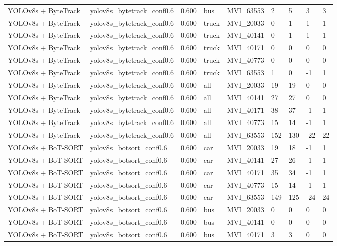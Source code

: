 \begin{tabular}{lllllllll}
YOLOv8s + ByteTrack & yolov8s\_bytetrack\_conf0.6 & 0.600 & bus & MVI\_63553 & 2 & 5 & 3 & 3 \\
YOLOv8s + ByteTrack & yolov8s\_bytetrack\_conf0.6 & 0.600 & truck & MVI\_20033 & 0 & 1 & 1 & 1 \\
YOLOv8s + ByteTrack & yolov8s\_bytetrack\_conf0.6 & 0.600 & truck & MVI\_40141 & 0 & 1 & 1 & 1 \\
YOLOv8s + ByteTrack & yolov8s\_bytetrack\_conf0.6 & 0.600 & truck & MVI\_40171 & 0 & 0 & 0 & 0 \\
YOLOv8s + ByteTrack & yolov8s\_bytetrack\_conf0.6 & 0.600 & truck & MVI\_40773 & 0 & 0 & 0 & 0 \\
YOLOv8s + ByteTrack & yolov8s\_bytetrack\_conf0.6 & 0.600 & truck & MVI\_63553 & 1 & 0 & -1 & 1 \\
YOLOv8s + ByteTrack & yolov8s\_bytetrack\_conf0.6 & 0.600 & all & MVI\_20033 & 19 & 19 & 0 & 0 \\
YOLOv8s + ByteTrack & yolov8s\_bytetrack\_conf0.6 & 0.600 & all & MVI\_40141 & 27 & 27 & 0 & 0 \\
YOLOv8s + ByteTrack & yolov8s\_bytetrack\_conf0.6 & 0.600 & all & MVI\_40171 & 38 & 37 & -1 & 1 \\
YOLOv8s + ByteTrack & yolov8s\_bytetrack\_conf0.6 & 0.600 & all & MVI\_40773 & 15 & 14 & -1 & 1 \\
YOLOv8s + ByteTrack & yolov8s\_bytetrack\_conf0.6 & 0.600 & all & MVI\_63553 & 152 & 130 & -22 & 22 \\
YOLOv8s + BoT-SORT & yolov8s\_botsort\_conf0.6 & 0.600 & car & MVI\_20033 & 19 & 18 & -1 & 1 \\
YOLOv8s + BoT-SORT & yolov8s\_botsort\_conf0.6 & 0.600 & car & MVI\_40141 & 27 & 26 & -1 & 1 \\
YOLOv8s + BoT-SORT & yolov8s\_botsort\_conf0.6 & 0.600 & car & MVI\_40171 & 35 & 34 & -1 & 1 \\
YOLOv8s + BoT-SORT & yolov8s\_botsort\_conf0.6 & 0.600 & car & MVI\_40773 & 15 & 14 & -1 & 1 \\
YOLOv8s + BoT-SORT & yolov8s\_botsort\_conf0.6 & 0.600 & car & MVI\_63553 & 149 & 125 & -24 & 24 \\
YOLOv8s + BoT-SORT & yolov8s\_botsort\_conf0.6 & 0.600 & bus & MVI\_20033 & 0 & 0 & 0 & 0 \\
YOLOv8s + BoT-SORT & yolov8s\_botsort\_conf0.6 & 0.600 & bus & MVI\_40141 & 0 & 0 & 0 & 0 \\
YOLOv8s + BoT-SORT & yolov8s\_botsort\_conf0.6 & 0.600 & bus & MVI\_40171 & 3 & 3 & 0 & 0 \\

\end{tabular}
